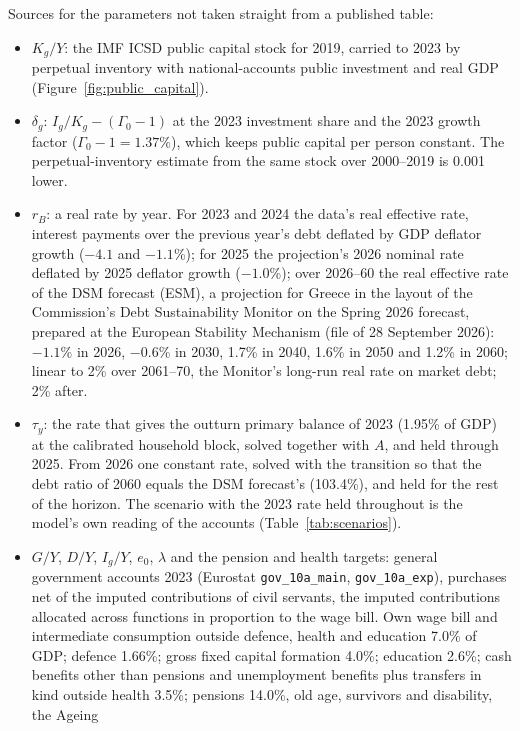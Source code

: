 \documentclass[11pt,a4paper]{article}
\begin{document}
\noindent\footnotesize
Sources for the parameters not taken straight from a published table:
\begin{itemize}
\item $K_g/Y$: the IMF ICSD public capital stock for 2019, carried to 2023 by
  perpetual inventory with national-accounts public investment and real GDP
  (Figure~\ref{fig:public_capital}).
\item $\delta_g$: $I_g/K_g-(\Gamma_0-1)$ at the 2023 investment share and
  the 2023 growth factor ($\Gamma_0-1=1.37\%$), which keeps public capital
  per person constant. The perpetual-inventory estimate from the same stock
  over 2000--2019 is 0.001 lower.
\item $r_B$: a real rate by year. For 2023 and 2024 the data's real effective
  rate, interest payments over the previous year's debt deflated by GDP
  deflator growth ($-4.1$ and $-1.1$\%); for 2025 the projection's 2026
  nominal rate deflated by 2025 deflator growth ($-1.0$\%); over 2026--60
  the real effective rate of the DSM forecast (ESM), a projection for
  Greece in the layout of the Commission's Debt Sustainability Monitor on
  the Spring 2026 forecast, prepared at the European Stability Mechanism
  (file of 28 September 2026): $-1.1$\% in
  2026, $-0.6$\% in 2030, 1.7\% in 2040, 1.6\% in 2050 and 1.2\% in 2060;
  linear to 2\% over 2061--70, the Monitor's long-run real rate on market
  debt; 2\% after.
\item $\tau_y$: the rate that gives the outturn primary balance of 2023
  (1.95\% of GDP) at the calibrated household block, solved together with
  $A$, and held through 2025. From 2026 one constant rate, solved with the
  transition so that the debt ratio of 2060 equals the DSM forecast's
  (103.4\%), and held for the rest of the horizon. The scenario
  with the 2023 rate held throughout is the model's own reading of the
  accounts (Table~\ref{tab:scenarios}).
\item $G/Y$, $D/Y$, $I_g/Y$, $e_0$, $\lambda$ and the pension and health
  targets: general government accounts 2023 (Eurostat \texttt{gov\_10a\_main},
  \texttt{gov\_10a\_exp}), purchases net of the imputed contributions of
  civil servants, the imputed contributions allocated across functions in
  proportion to the wage bill. Own wage bill and intermediate consumption
  outside defence, health and education 7.0\% of GDP; defence 1.66\%; gross
  fixed capital formation 4.0\%; education 2.6\%; cash benefits other than
  pensions and unemployment benefits plus transfers in kind outside health
  3.5\%; pensions 14.0\%, old age, survivors and disability, the Ageing

\end{itemize}
\end{document}
